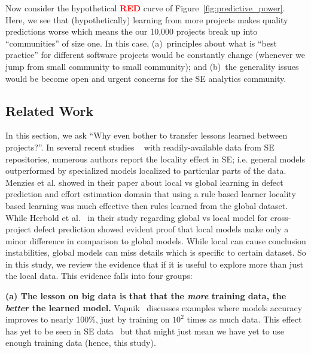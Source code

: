 \documentclass[sigconf,review]{acmart}
\theoremstyle{break}
\begin{document}
Now consider the hypothetical \textcolor{red}{{\bf RED}} curve of Figure~\ref{fig:predictive_power}. Here, we see that (hypothetically)  learning from more projects makes quality predictions worse which means the our 10,000 projects break up into ``communities'' of size one. In this case,  (a)~principles about what is ``best practice'' for different software projects would be constantly change (whenever we jump from small community to small community); and (b)~the generality issues would be become open and urgent concerns for the SE analytics community.


\subsection{Related Work}
\label{sec:related}

In this section, we ask ``Why even bother to transfer lessons learned between projects?''. In several recent studies ~\cite{bettenburg2012think, menzies2012local, posnett2011ecological} with readily-available data from SE repositories, numerous authors report the locality effect in SE; i.e. general models outperformed by specialized models localized to particular parts of the data. Menzies et al. showed in their paper about local vs global learning in defect prediction and effort estimation domain that using a rule based learner locality based learning was much effective then rules learned from the global dataset. While Herbold et al.~\cite{herbold2017global} in their study regarding global vs local model for cross-project defect prediction showed evident proof that local models make only a minor difference in comparison to global models. While local can cause conclusion instabilities, global models can miss details which is specific to certain dataset. So in this study, we review the evidence that if it is useful to explore more than just the local data. This evidence falls into four groups:

\textbf{(a) The lesson on big data is that that the {\em more} training data, the {\em better} the learned model.} Vapnik~\cite{vapnik14} discusses examples where models accuracy improves to nearly 100\%, just by training on $10^2$ times as much data. This effect has yet to be seen in SE data~\cite{menzies2013guest} but that might just mean we have yet to use enough training data (hence, this study). 
\end{document}
